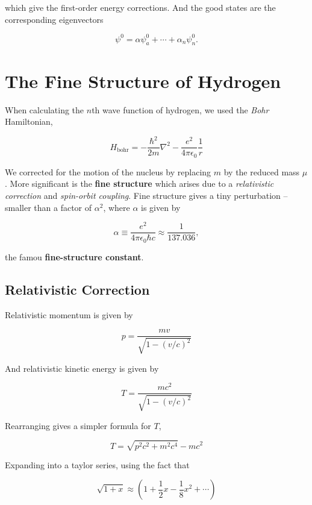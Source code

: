 \documentclass[svgnames]{article}
\begin{document}
which give the first-order energy corrections. And the good states are the corresponding eigenvectors 

\[
\psi^{0} = \alpha \psi_a^{0} + \cdots  + \alpha_n \psi_n^{0}. 
\] \vspace{3px}

\section{The Fine Structure of Hydrogen} 

When calculating the $n$th wave function of hydrogen, we used the \textit{Bohr} Hamiltonian, 

\[
H_\text{bohr} = -\frac{\hbar^2}{2m}\nabla^2 - \frac{e^2}{4\pi\epsilon_0} \frac{1}{r}
\] \vspace{3px}

We corrected for the motion of the nucleus by replacing $m$ by the reduced mass $\mu$. More significant is 
the \textbf{fine structure} which arises due to a \textit{relativistic correction} and \textit{spin-orbit coupling}.
Fine structure gives a tiny perturbation -- smaller than a factor of $\alpha^2$, where $\alpha$ is given by 

\[
\alpha \equiv \frac{e^2}{4\pi\epsilon_0\hbar c} \approx \frac{1}{137.036},
\] \vspace{3px}

the famou \textbf{fine-structure constant}. 

\subsection{Relativistic Correction} 

Relativistic momentum is given by 

\[
    p = \frac{mv}{\sqrt{1 - (v/c)^2}}
\] \vspace{3px}

And relativistic kinetic energy is given by 

\[
    T = \frac{mc^2}{\sqrt{1 - (v/c)^2}}
\] \vspace{3px}

Rearranging gives a simpler formula for $T$, 

\[
    T = \sqrt{p^2c^2 + m^2 c^4} - mc^2
\] \vspace{3px}

Expanding into a taylor series, using the fact that 

\[
    \sqrt{1+x} \approx \left(1 + \frac{1}{2}x - \frac{1}{8}x^2 + \cdots\right)
\] \vspace{3px}
\end{document}
